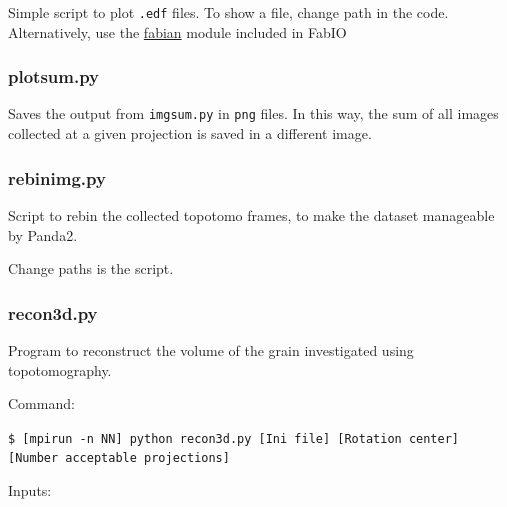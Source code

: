 \documentclass[11pt]{scrartcl}
\begin{document}
Simple script to plot {\texttt{.edf}} files. To show a file, change path in the code. Alternatively, use the \href{https://sourceforge.net/p/fable/wiki/fabian/}{fabian} module included in FabIO \cite{knudsen2013fabio}

\subsubsection{plot\textunderscore sum.py}
\label{sub_s:plot_sum}

Saves the output from {\texttt{img\textunderscore sum.py}} in {\texttt{png}} files. In this way, the sum of all images collected at a given projection is saved in a different image. 

\subsubsection{rebin\textunderscore img.py}
\label{sub_s:rebin}

Script to rebin the collected topotomo frames, to make the dataset manageable by Panda2. 

\danger Change paths is the script.

\subsubsection{recon3d.py}

Program to reconstruct the volume of the grain investigated using topotomography. 

Command: 

{\texttt{\$ [mpirun -n NN] python recon3d.py [Ini file] [Rotation center] [Number acceptable projections]}}

Inputs:
\end{document}
